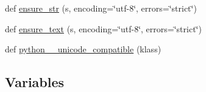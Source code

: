 \begin{DoxyCompactItemize}
\item 
def \hyperlink{namespacepip_1_1__vendor_1_1urllib3_1_1packages_1_1six_a75cfaee3f7a2bf3780de74593247dd35}{ensure\+\_\+str} (s, encoding=\char`\"{}utf-\/8\char`\"{}, errors=\char`\"{}strict\char`\"{})
\item 
def \hyperlink{namespacepip_1_1__vendor_1_1urllib3_1_1packages_1_1six_ae478cd0f9b05f392322a70cb1cc3f9d1}{ensure\+\_\+text} (s, encoding=\char`\"{}utf-\/8\char`\"{}, errors=\char`\"{}strict\char`\"{})
\item 
def \hyperlink{namespacepip_1_1__vendor_1_1urllib3_1_1packages_1_1six_a11fb759c3fab324ecec7cebdfe91b896}{python\+\_\+\_\+unicode\+\_\+compatible} (klass)
\end{DoxyCompactItemize}
\subsection*{Variables}
